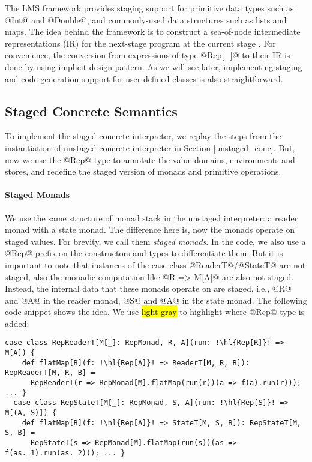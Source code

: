 The LMS framework provides staging support for primitive data types such as
@Int@ and @Double@, and commonly-used data structures such as lists and maps.
The idea behind the framework is to construct a sea-of-node intermediate
representations (IR) for the next-stage program at the current stage
\cite{DBLP:conf/birthday/Rompf16}. For convenience, the conversion from
expressions of type @Rep[_]@ to their IR is done by using implicit design
pattern. As we will see later, implementing staging and code generation
support for user-defined classes is also straightforward.

\subsection{Staged Concrete Semantics}

To implement the staged concrete interpreter, we replay the steps from the
instantiation of unstaged concrete interpreter in Section \ref{unstaged_conc}.
But, now we use the @Rep@ type to annotate the value domains, environments and
stores, and redefine the staged version of monads and primitive operations.

\paragraph{Staged Monads}
We use the same structure of monad stack in the unstaged interpreter: a reader
monad with a state monad. The difference here is, now the monads operate on staged values. 
For brevity, we call them \textit{staged monads}. In the code, we also use a @Rep@
prefix on the constructors and types to differentiate them. But it is important
to note that instances of the case class @ReaderT@/@StateT@ are not staged, also the
monadic computation like @R => M[A]@ are also not staged. Instead, the internal
data that these monads operate on are staged, i.e., @R@ and @A@ in the
reader monad, @S@ and @A@ in the state monad. The following code
snippet shows the idea. We use \hl{light gray} to highlight where @Rep@ type is added:
\begin{lstlisting}[escapechar=!]
  case class RepReaderT[M[_]: RepMonad, R, A](run: !\hl{Rep[R]}! => M[A]) {
    def flatMap[B](f: !\hl{Rep[A]}! => ReaderT[M, R, B]): RepReaderT[M, R, B] =
      RepReaderT(r => RepMonad[M].flatMap(run(r))(a => f(a).run(r))); ... }
  case class RepStateT[M[_]: RepMonad, S, A](run: !\hl{Rep[S]}! => M[(A, S)]) {
    def flatMap[B](f: !\hl{Rep[A]}! => StateT[M, S, B]): RepStateT[M, S, B] =
      RepStateT(s => RepMonad[M].flatMap(run(s))(as => f(as._1).run(as._2))); ... }
\end{lstlisting}

